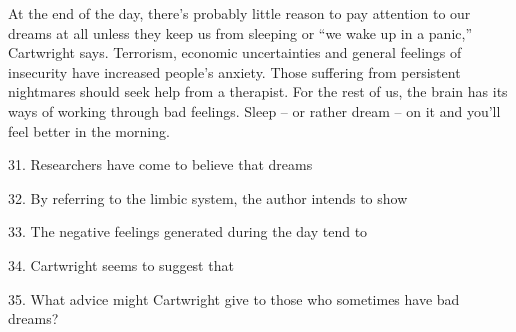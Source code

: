 \qquad At the end of the day, there's probably little reason to pay attention to our dreams at all unless they keep us from sleeping or ``we wake up in a panic,'' Cartwright says. Terrorism, economic uncertainties and general feelings of insecurity have increased people's anxiety. Those suffering from persistent nightmares should seek help from a therapist. For the rest of us, the brain has its ways of working through bad feelings. Sleep -- or rather dream -- on it and you'll feel better in the morning.

\vspace{6pt}

31. Researchers have come to believe that dreams\par

32. By referring to the limbic system, the author intends to show\par

33. The negative feelings generated during the day tend to\par

34. Cartwright seems to suggest that\par

35. What advice might Cartwright give to those who sometimes have bad dreams?\par
